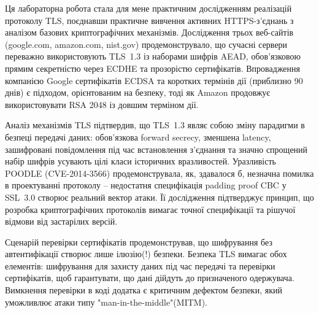 Ця лабораторна робота стала для мене практичним дослідженням реалізацій протоколу TLS, поєднавши практичне вивчення 
активних HTTPS-з’єднань з аналізом базових криптографічних механізмів. Дослідження трьох веб-сайтів (google.com, 
amazon.com, nist.gov) продемонструвало, що сучасні сервери переважно використовують TLS~1.3 із наборами шифрів 
AEAD, обов’язковою прямим секретністю через ECDHE та прозорістю сертифікатів. Впровадження компанією Google 
сертифікатів ECDSA та коротких термінів дії (приблизно 90 днів) є підходом, орієнтованим на безпеку, тоді як 
Amazon продовжує використовувати RSA 2048 із довшим терміном дії.

Аналіз механізмів TLS підтвердив, що TLS~1.3 являє собою зміну парадигми в безпеці передачі даних: обов’язкова 
forward secrecy, зменшена latency, зашифровані повідомлення під час встановлення з’єднання та значно спрощений 
набір шифрів усувають цілі класи історичних вразливостей. Уразливість POODLE (CVE-2014-3566) продемонструвала, 
як, здавалося б, незначна помилка в проектуванні протоколу -- недостатня специфікація padding proof CBC у SSL~3.0 
створює реальний вектор атаки. Її дослідження підтверджує принцип, що розробка криптографічних протоколів вимагає 
точної специфікації та рішучої відмови від застарілих версій.

Сценарій перевірки сертифікатів продемонстрував, що шифрування без автентифікації створює лише ілюзію(!) безпеки. 
Безпека TLS вимагає обох елементів: шифрування для захисту даних під час передачі та перевірки сертифікатів, щоб 
гарантувати, що дані дійдуть до призначеного одержувача. Вимкнення перевірки в коді додатка є критичним дефектом 
безпеки, який уможливлює атаки типу "man-in-the-middle"{}(MITM).
